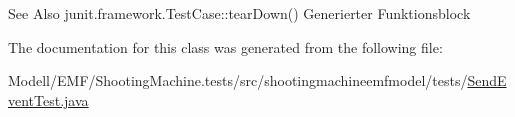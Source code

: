 \begin{DoxySeeAlso}{See Also}
junit.\-framework.\-Test\-Case\-::tear\-Down() Generierter Funktionsblock 
\end{DoxySeeAlso}


The documentation for this class was generated from the following file\-:\begin{DoxyCompactItemize}
\item 
Modell/\-E\-M\-F/\-Shooting\-Machine.\-tests/src/shootingmachineemfmodel/tests/\hyperlink{_send_event_test_8java}{Send\-Event\-Test.\-java}\end{DoxyCompactItemize}
